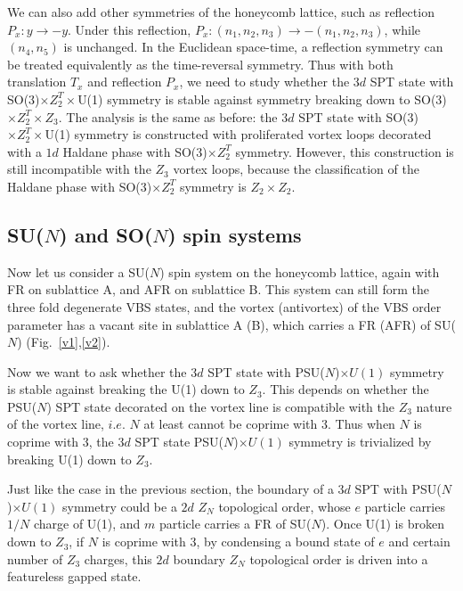 \documentclass[aps,prb,twocolumn,superscriptaddress,showpacs]{revtex4}
\begin{document}
We can also add other symmetries of the honeycomb lattice, such as
reflection $P_x: y \rightarrow -y$. Under this reflection, $ P_x:
(n_1, n_2, n_3) \rightarrow - (n_1, n_2, n_3)$, while $(n_4, n_5)$
is unchanged. In the Euclidean space-time, a reflection symmetry
can be treated equivalently as the time-reversal symmetry.  Thus
with both translation $T_x$ and reflection $P_x$, we need to study
whether the $3d$ SPT state with SO(3)$\times Z_2^T \times $U(1)
symmetry is stable against symmetry breaking down to SO(3)$\times
Z_2^T \times Z_3$. The analysis is the same as before: the $3d$
SPT state with SO(3)$\times Z_2^T \times $U(1) symmetry is
constructed with proliferated vortex loops decorated with a $1d$
Haldane phase with SO(3)$\times Z_2^T$ symmetry. However, this
construction is still incompatible with the $Z_3$ vortex loops,
because the classification of the Haldane phase with SO(3)$\times
Z_2^T$ symmetry is $Z_2\times Z_2$.

\subsection{SU($N$) and SO($N$) spin systems}

Now let us consider a SU($N$) spin system on the honeycomb
lattice, again with FR on sublattice A, and AFR on sublattice B.
This system can still form the three fold degenerate VBS states,
and the vortex (antivortex) of the VBS order parameter has a
vacant site in sublattice A (B), which carries a FR (AFR) of
SU($N$) (Fig.~\ref{v1},\ref{v2}).

Now we want to ask whether the $3d$ SPT state with PSU($N$)$\times
U(1)$ symmetry is stable against breaking the U(1) down to $Z_3$.
This depends on whether the PSU($N$) SPT state decorated on the
vortex line is compatible with the $Z_3$ nature of the vortex
line, $i.e.$ $N$ at least cannot be coprime with $3$. Thus when
$N$ is coprime with $3$, the $3d$ SPT state PSU($N$)$\times U(1)$
symmetry is trivialized by breaking U(1) down to $Z_3$.

Just like the case in the previous section, the boundary of a $3d$
SPT with PSU($N$)$\times U(1)$ symmetry could be a $2d$ $Z_N$
topological order, whose $e$ particle carries $1/N$ charge of
U(1), and $m$ particle carries a FR of SU($N$). Once U(1) is
broken down to $Z_3$, if $N$ is coprime with 3, by condensing a
bound state of $e$ and certain number of $Z_3$ charges, this $2d$
boundary $Z_N$ topological order is driven into a featureless
gapped state.
\end{document}
